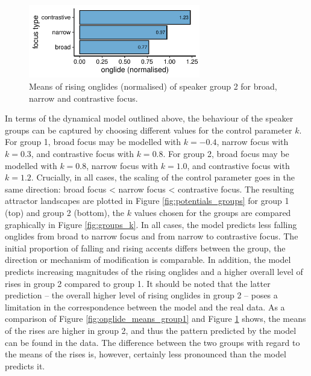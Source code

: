 \begin{figure}[htbp]
\begin{center}
\includegraphics[width=7.5cm]{figures/ch6/onglide_norm_rising_means_group2.pdf}
\caption{Means of rising onglides (normalised) of speaker group 2 for broad, narrow and contrastive focus.}
\label{fig:onglide_means_group2}
\end{center}
\end{figure}

In terms of the dynamical model outlined above, the behaviour of the speaker groups can be captured by choosing different values for the control parameter $k$. For group 1, broad focus may be modelled with $k = -0.4$, narrow focus with $k = 0.3$, and contrastive focus with $k = 0.8$. For group 2, broad focus may be modelled with $k = 0.8$, narrow focus with $k =  1.0$, and contrastive focus with $k = 1.2$. Crucially, in all cases, the scaling of the control parameter goes in the same direction: broad focus < narrow focus < contrastive focus. The resulting attractor landscapes are plotted in Figure \ref{fig:potentials_groups} for group 1 (top) and group 2 (bottom), the $k$ values chosen for the groups are compared graphically in Figure \ref{fig:groups_k}. In all cases, the model predicts less falling onglides from broad to narrow focus and from narrow to contrastive focus. The initial proportion of falling and rising accents differs between the group, the direction or mechanism of modification is comparable. In addition, the model predicts increasing magnitudes of the rising onglides and a higher overall level of rises in group 2 compared to group 1. It should be noted that the latter prediction -- the overall higher level of rising onglides in group 2 -- poses a limitation in the correspondence between the model and the real data. As a comparison of Figure \ref{fig:onglide_means_group1} and Figure \ref{fig:onglide_means_group2} shows, the means of the rises are higher in group 2, and thus the pattern predicted by the model can be found in the data. The difference between the two groups with regard to the means of the rises is, however, certainly less pronounced than the model predicts it.

